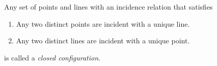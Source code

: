 Any set of points and lines with an incidence relation that satisfies

\begin{enumerate}
  \item[(i)] Any two distinct points are incident with a unique line.
  \item[(ii)] Any two distinct lines are incident with a unique point.
\end{enumerate}

is called a \textit{closed configuration}.
